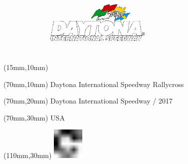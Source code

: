 \null\newpage
\begin{textblock*}{50mm}(15mm,10mm)%
\includegraphics[width=50mm]{LG/DAY.png}
\end{textblock*}
\begin{textblock*}{130mm}(70mm,10mm)%
{\fontsize{20}{20}\selectfont Daytona International Speedway Rallycross}\\
\end{textblock*}
\begin{textblock*}{120mm}(70mm,20mm)%
{\fontsize{16}{16}\selectfont Daytona International Speedway / 2017}\\
\end{textblock*}
\begin{textblock*}{120mm}(70mm,30mm)%
{\fontsize{12}{12}\selectfont USA}
\end{textblock*}
\begin{textblock*}{30mm}(110mm,30mm)%
\centering
\includegraphics[height=15mm]{icons/fa-rotate-right.pdf}
\end{textblock*}

